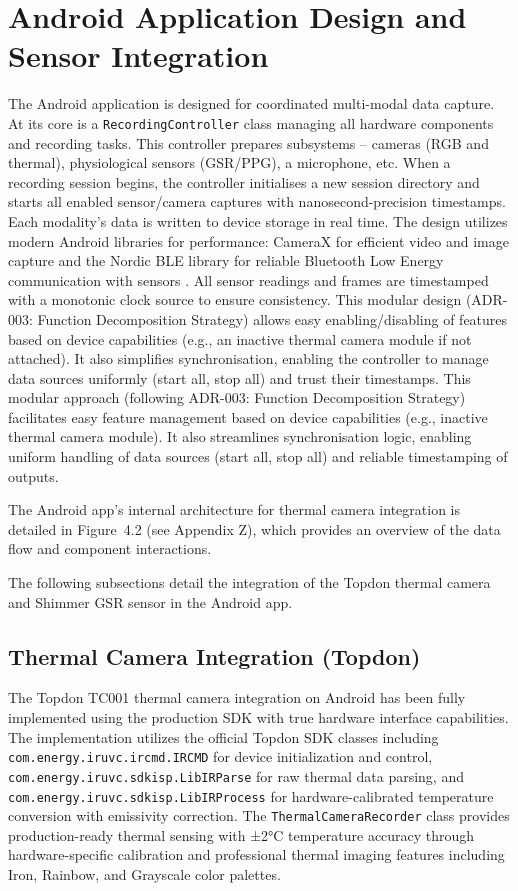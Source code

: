\section{Android Application Design and Sensor Integration}\label{sec:4-2}
The Android application is designed for coordinated multi-modal data capture. At its core is a \texttt{RecordingController} class managing all hardware components and recording tasks. This controller prepares subsystems -- cameras (RGB and thermal), physiological sensors (GSR/PPG), a microphone, etc. When a recording session begins, the controller initialises a new session directory and starts all enabled sensor/camera captures with nanosecond-precision timestamps. Each modality's data is written to device storage in real time. The design utilizes modern Android libraries for performance: CameraX for efficient video and image capture \cite{ref13} and the Nordic BLE library for reliable Bluetooth Low Energy communication with sensors \cite{ref14}. All sensor readings and frames are timestamped with a monotonic clock source to ensure consistency. This modular design (ADR-003: Function Decomposition Strategy) allows easy enabling/disabling of features based on device capabilities (e.g., an inactive thermal camera module if not attached). It also simplifies synchronisation, enabling the controller to manage data sources uniformly (start all, stop all) and trust their timestamps. This modular approach (following ADR-003: Function Decomposition Strategy) facilitates easy feature management based on device capabilities (e.g., inactive thermal camera module). It also streamlines synchronisation logic, enabling uniform handling of data sources (start all, stop all) and reliable timestamping of outputs.

The Android app's internal architecture for thermal camera integration is detailed in Figure~4.2 (see Appendix Z), which provides an overview of the data flow and component interactions.

The following subsections detail the integration of the Topdon thermal camera and Shimmer GSR sensor in the Android app.

\subsection{Thermal Camera Integration (Topdon)}\label{sec:4-2-1}
The Topdon TC001 thermal camera integration on Android has been fully implemented using the production SDK with true hardware interface capabilities. The implementation utilizes the official Topdon SDK classes including \texttt{com.energy.iruvc.ircmd.IRCMD} for device initialization and control, \texttt{com.energy.iruvc.sdkisp.LibIRParse} for raw thermal data parsing, and \texttt{com.energy.iruvc.sdkisp.LibIRProcess} for hardware-calibrated temperature conversion with emissivity correction. The \texttt{ThermalCameraRecorder} class provides production-ready thermal sensing with ±2°C temperature accuracy through hardware-specific calibration and professional thermal imaging features including Iron, Rainbow, and Grayscale color palettes.

